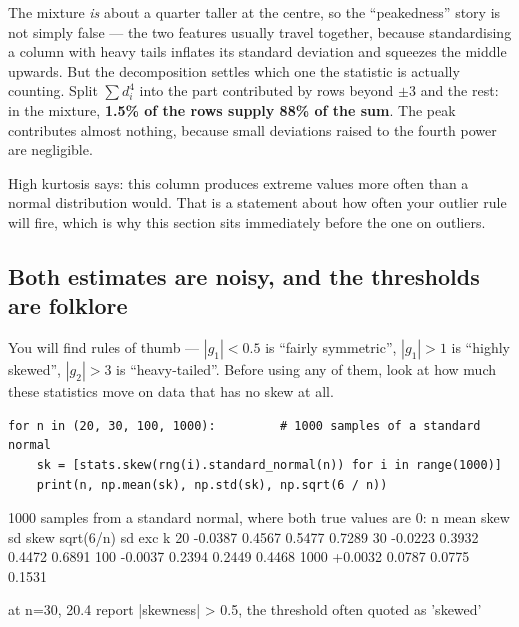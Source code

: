 \documentclass[11pt]{article}
\begin{document}
The mixture \emph{is} about a quarter taller at the centre, so the ``peakedness''
story is not simply false --- the two features usually travel together, because
standardising a column with heavy tails inflates its standard deviation and
squeezes the middle upwards. But the decomposition settles which one the
statistic is actually counting. Split $\sum d_i^4$ into the part contributed by
rows beyond $\pm 3$ and the rest: in the mixture, \textbf{1.5\% of the rows
supply 88\% of the sum}. The peak contributes almost nothing, because small
deviations raised to the fourth power are negligible.

\begin{keyidea}
High kurtosis says: this column produces extreme values more often than a
normal distribution would. That is a statement about how often your outlier
rule will fire, which is why this section sits immediately before the one on
outliers.
\end{keyidea}

\subsection{Both estimates are noisy, and the thresholds are folklore}

You will find rules of thumb --- $|g_1| < 0.5$ is ``fairly symmetric'',
$|g_1| > 1$ is ``highly skewed'', $|g_2| > 3$ is ``heavy-tailed''. Before
using any of them, look at how much these statistics move on data that has no
skew at all.

\begin{lstlisting}
for n in (20, 30, 100, 1000):         # 1000 samples of a standard normal
    sk = [stats.skew(rng(i).standard_normal(n)) for i in range(1000)]
    print(n, np.mean(sk), np.std(sk), np.sqrt(6 / n))
\end{lstlisting}
\begin{codeout}
1000 samples from a standard normal, where both true values are 0:
     n    mean skew    sd skew      sqrt(6/n)   sd exc k
    20      -0.0387     0.4567         0.5477     0.7289
    30      -0.0223     0.3932         0.4472     0.6891
   100      -0.0037     0.2394         0.2449     0.4468
  1000      +0.0032     0.0787         0.0775     0.1531

at n=30, 20.4%
report |skewness| > 0.5, the threshold often quoted as 'skewed'
\end{codeout}
\end{document}
